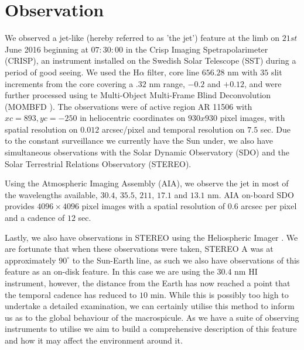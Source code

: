 \documentclass{emulateapj}
\begin{document}
 
 







\section{Observation}
\label{obs_sect}
We observed a jet-like (hereby referred to as 'the jet') feature at the limb on $21st$ June 2016 beginning at $07:30:00$ in the Crisp Imaging Spetrapolarimeter (CRISP), an instrument installed on the Swedish Solar Telescope (SST) during a period of good seeing. %
We used the H$\alpha$ filter, core line $656.28$ nm with $35$ slit increments from the core covering a $.32$ nm range, $-0.2$ and $+0.12$, and were further processed using te Multi-Object Multi-Frame Blind Deconvolution (MOMBFD \cite{vanNoort2005}).
The observations were of active region AR 11506 with $xc = 893, yc = -250$ in heliocentric coordinates on $930x930$ pixel images, with spatial resolution on $0.012$ arcsec/pixel and temporal resolution on $7.5$ sec.
Due to the constant surveillance we currently have the Sun under, we also have simultaneous observations with the Solar Dynamic Observatory (SDO) and the Solar Terrestrial Relations Observatory (STEREO).

Using the Atmospheric Imaging Assembly (AIA), we observe the jet in most of the wavelengths available, $30.4$, $35.5$, $211$, $17.1$ and $13.1$ nm.
AIA on-board SDO \cite{AIAspec} provides $4096 \times 4096$ pixel images with a spatial resolution of $0.6$ arcsec per pixel and a cadence of $12$ sec.

Lastly, we also have observations in STEREO using the Heliospheric Imager \citep{Defise2001}. 
We are fortunate that when these observations were taken, STEREO A was at approximately $90^\circ$ to the Sun-Earth line, as such we also have observations of this feature as an on-disk feature.
In this case we are using the $30.4$ nm HI instrument, however, the distance from the Earth has now reached a point that the temporal cadence has reduced to $10$ min.
While this is possibly too high to undertake a detailed examination, we can certainly utilise this method to inform us as to the global behaviour of the macrospicule.
As we have a suite of observing instruments to utilise we aim to build a comprehensive description of this feature and how it may affect the environment around it.
\end{document}
